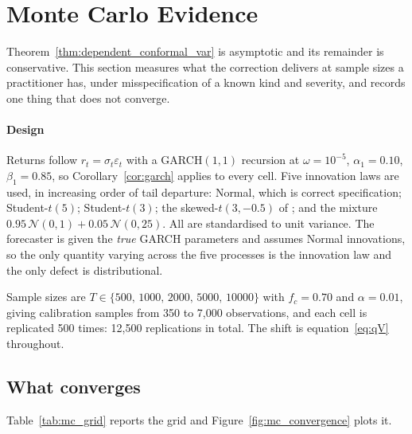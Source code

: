 \section{Monte Carlo Evidence}
\label{sec:mc}

Theorem~\ref{thm:dependent_conformal_var} is asymptotic and its remainder is
conservative. This section measures what the correction delivers at sample sizes
a practitioner has, under misspecification of a known kind and severity, and
records one thing that does not converge.

\paragraph{Design} Returns follow $r_t = \sigma_t\varepsilon_t$ with a
GARCH$(1,1)$ recursion at $\omega = 10^{-5}$, $\alpha_1 = 0.10$,
$\beta_1 = 0.85$, so Corollary~\ref{cor:garch} applies to every cell. Five
innovation laws are used, in increasing order of tail departure: Normal, which is
correct specification; Student-$t(5)$; Student-$t(3)$; the skewed-$t(3,-0.5)$ of
\citet{hansen1994autoregressive}; and the mixture
$0.95\,\mathcal N(0,1)+0.05\,\mathcal N(0,25)$. All are standardised to unit
variance. The forecaster is given the \emph{true} GARCH parameters and assumes
Normal innovations, so the only quantity varying across the five processes is the
innovation law and the only defect is distributional.

Sample sizes are $T\in\{500,\,1000,\,2000,\,5000,\,10000\}$ with $f_c = 0.70$ and
$\alpha = 0.01$, giving calibration samples from 350 to 7{,}000 observations, and
each cell is replicated 500 times: 12{,}500 replications in total. The shift is
equation~\eqref{eq:qV} throughout.

\subsection{What converges}
\label{sec:mc_converges}

Table~\ref{tab:mc_grid} reports the grid and Figure~\ref{fig:mc_convergence}
plots it.


